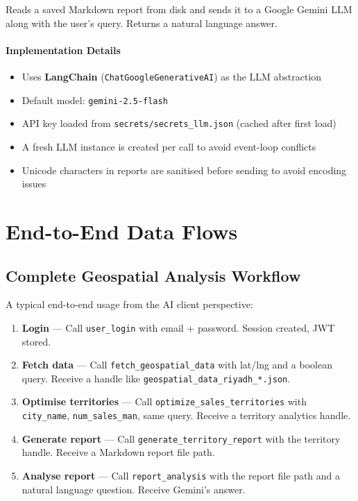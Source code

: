 \documentclass[12pt,a4paper]{report}
\begin{document}
Reads a saved Markdown report from disk and sends it to a Google Gemini LLM
along with the user's query. Returns a natural language answer.

\subsubsection{Implementation Details}

\begin{itemize}[noitemsep]
  \item Uses \textbf{LangChain} (\texttt{ChatGoogleGenerativeAI}) as the LLM abstraction
  \item Default model: \texttt{gemini-2.5-flash}
  \item API key loaded from \texttt{secrets/secrets\_llm.json} (cached after first load)
  \item A fresh LLM instance is created per call to avoid event-loop conflicts
  \item Unicode characters in reports are sanitised before sending to avoid encoding issues
\end{itemize}

\chapter{End-to-End Data Flows}

\section{Complete Geospatial Analysis Workflow}

A typical end-to-end usage from the AI client perspective:

\begin{enumerate}
  \item \textbf{Login} --- Call \texttt{user\_login} with email + password.
    Session created, JWT stored.
  \item \textbf{Fetch data} --- Call \texttt{fetch\_geospatial\_data} with lat/lng
    and a boolean query. Receive a handle like
    \texttt{geospatial\_data\_riyadh\_*.json}.
  \item \textbf{Optimise territories} --- Call \texttt{optimize\_sales\_territories}
    with \texttt{city\_name}, \texttt{num\_sales\_man}, same query. Receive a
    territory analytics handle.
  \item \textbf{Generate report} --- Call \texttt{generate\_territory\_report} with
    the territory handle. Receive a Markdown report file path.
  \item \textbf{Analyse report} --- Call \texttt{report\_analysis} with the report
    file path and a natural language question. Receive Gemini's answer.
\end{enumerate}
\end{document}
